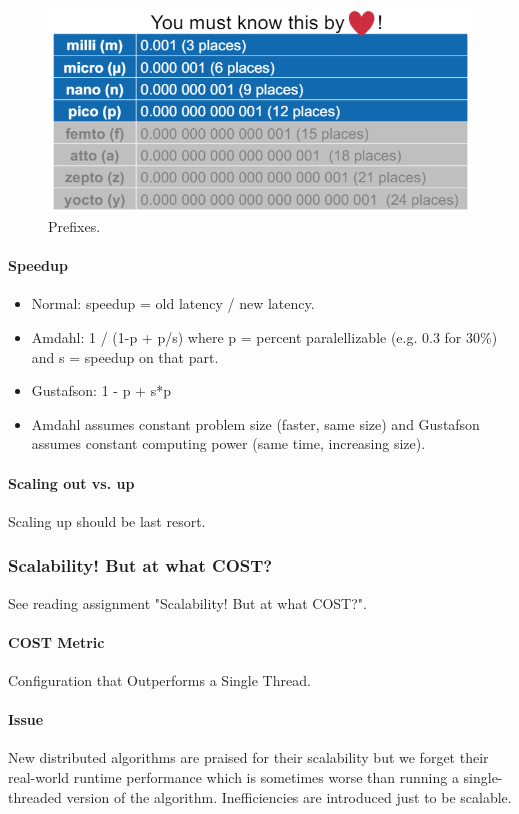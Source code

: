 \begin{figure}[h]
	\centering
	\includegraphics[scale=0.7]{images/4-units.PNG}
	\caption{Prefixes.}
	\label{fig:units}
\end{figure}

\paragraph{Speedup}
\begin{itemize}
    \item Normal: speedup = old latency / new latency.
    \item Amdahl: 1 / (1-p + p/s) where p = percent paralellizable (e.g. 0.3 for 30\%) and s = speedup on that part.
    \item Gustafson: 1 - p + s*p
    \item Amdahl assumes constant problem size (faster, same size) and Gustafson assumes constant computing power (same time, increasing size).
\end{itemize}

\paragraph{Scaling out vs. up}
Scaling up should be last resort. %



\subsubsection{Scalability! But at what COST?}

See reading assignment "Scalability! But at what COST?".

\paragraph{COST Metric}
Configuration that Outperforms a Single Thread.

\paragraph{Issue}
New distributed algorithms are praised for their scalability but we forget their real-world runtime performance which is sometimes worse than running a single-threaded version of the algorithm. Inefficiencies are introduced just to be scalable.



